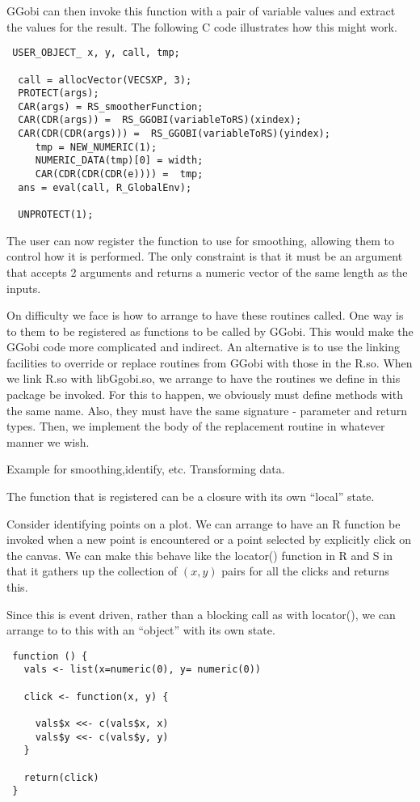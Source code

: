 GGobi can then invoke this function with a pair of variable values and
extract the values for the result.
The following C code illustrates how this might work.
\begin{verbatim}
 USER_OBJECT_ x, y, call, tmp;

  call = allocVector(VECSXP, 3);
  PROTECT(args);
  CAR(args) = RS_smootherFunction;
  CAR(CDR(args)) =  RS_GGOBI(variableToRS)(xindex);
  CAR(CDR(CDR(args))) =  RS_GGOBI(variableToRS)(yindex);
     tmp = NEW_NUMERIC(1);
     NUMERIC_DATA(tmp)[0] = width;
     CAR(CDR(CDR(CDR(e)))) =  tmp;
  ans = eval(call, R_GlobalEnv);

  UNPROTECT(1);
\end{verbatim}

The user can now register the function to use for smoothing, allowing
them to control how it is performed. The only constraint is that it
must be an argument that accepts 2 arguments and returns a numeric
vector of the same length as the inputs.



On difficulty we face is how to arrange to have these routines called.
One way is to them to be registered as functions to be called by
GGobi. This would make the GGobi code more complicated and indirect.
An alternative is to use the linking facilities to override or replace
routines from GGobi with those in the R.so.  When we link R.so with
libGgobi.so, we arrange to have the routines we define in this package
be invoked.  For this to happen, we obviously must define methods with
the same name. Also, they must have the same signature - parameter and
return types. Then, we implement the body of the replacement
routine in whatever manner we wish.





Example for smoothing,identify, etc.
Transforming data.



The function that is registered can be a closure
with its own ``local'' state.


Consider identifying points on a plot.  We can arrange to have an R
function be invoked when a new point is encountered or a point
selected by explicitly click on the canvas.
We can make this behave like the locator() function
in R and S in that it gathers up the collection of 
$(x, y)$ pairs for all the clicks
and returns this.

Since this is event driven, rather than a blocking call as with
locator(), we can arrange to to this with an ``object'' with its own
state.
\begin{verbatim}
 function () {
   vals <- list(x=numeric(0), y= numeric(0))

   click <- function(x, y) {
    
     vals$x <<- c(vals$x, x)
     vals$y <<- c(vals$y, y)
   }

   return(click)
 }
\end{verbatim}



